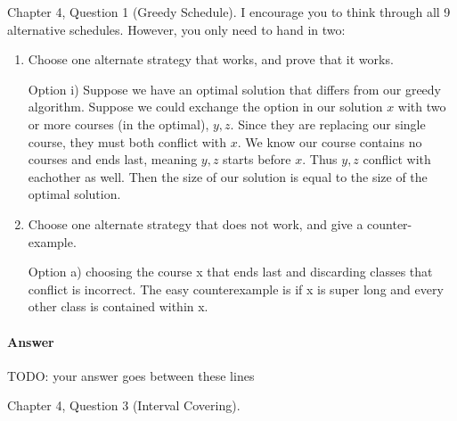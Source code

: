 \documentclass{article}
\begin{document}
Chapter 4, Question 1 (Greedy Schedule).  I encourage you to think through all 9
alternative schedules.  However, you only need to hand in two:
\begin{enumerate}
    \item Choose one alternate strategy that
        works, and prove that it works.

		Option i)
		Suppose we have an optimal solution that differs from our
		greedy algorithm.  Suppose
		we could exchange the option in our solution $x$ with two or more
		courses (in the optimal), $y,z$. Since they are replacing our single course,
		they must both conflict with $x$. We know our course contains no courses and ends last, meaning
		$y,z$ starts before $x$. Thus $y,z$ conflict with eachother as well. Then the size of our solution is equal to the size of the optimal solution.
		
    \item Choose one alternate strategy that does not work, and give a
        counter-example.

	Option a) choosing the course x that ends last and discarding classes
		that conflict is incorrect. The easy counterexample is if x
		is super long and every other class is contained within x.
\end{enumerate}

\paragraph{Answer}

TODO: your answer goes between these lines



\nextprob
{}

Chapter 4, Question 3 (Interval Covering).
\end{document}
